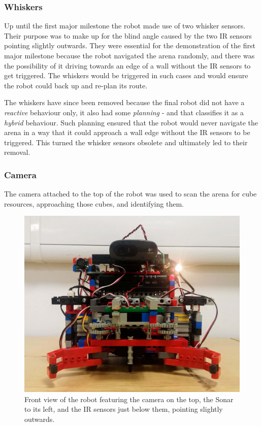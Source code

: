 \subsubsection{Whiskers}
\label{sec:whiskers}

Up until the first major milestone the robot made use of two whisker sensors. Their purpose was to make up for the blind angle caused by the two IR sensors pointing slightly outwards. They were essential for the demonstration of the first major milestone because the robot navigated the arena randomly, and there was the possibility of it driving towards an edge of a wall without the IR sensors to get triggered. The whiskers would be triggered in such cases and would ensure the robot could back up and re-plan its route.

The whiskers have since been removed because the final robot did not have a \textit{reactive} behaviour only, it also had some \textit{planning} - and that classifies it as a \textit{hybrid} behaviour. Such planning ensured that the robot would never navigate the arena in a way that it could approach a wall edge without the IR sensors to be triggered. This turned the whisker sensors obsolete and ultimately led to their removal.

\subsubsection{Camera}

The camera attached to the top of the robot was used to scan the arena for cube resources, approaching those cubes, and identifying them.

\bigskip

\begin{figure}[ht]
    \centering
    \includegraphics[width=0.7\linewidth]{res/robot-pics/view-front.jpg}
    \caption{Front view of the robot featuring the camera on the top, the Sonar to its left, and the IR sensors just below them, pointing slightly outwards.}
    \label{fig:camera}
\end{figure}

